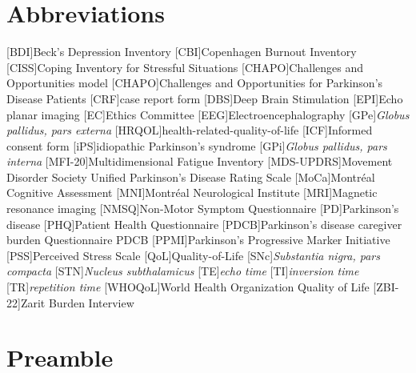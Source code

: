 

\chapter*{Abbreviations}
\thispagestyle{plain}
\begin{multicols}{2}
\begin{acronym}
[BDI]{Beck's Depression Inventory}
[CBI]{Copenhagen Burnout Inventory}
[CISS]{Coping Inventory for Stressful Situations}
[CHAPO]{Challenges and Opportunities model}
[CHAPO]{Challenges and Opportunities for Parkinson's Disease Patients}
[CRF]{case report form}
[DBS]{Deep Brain Stimulation}
[EPI]{Echo planar imaging}
[EC]{Ethics Committee}
[EEG]{Electroencephalography}
[GPe]{\textit{Globus pallidus, pars externa}}
[HRQOL]{health-related-quality-of-life}
[ICF]{Informed consent form}
[iPS]{idiopathic Parkinson's syndrome}
[GPi]{\textit{Globus pallidus, pars interna}}
[MFI-20]{Multidimensional Fatigue Inventory}
[MDS-UPDRS]{Movement Disorder Society Unified Parkinson's Disease Rating Scale}
[MoCa]{Montréal Cognitive Assessment}
[MNI]{Montréal Neurological Institute}
[MRI]{Magnetic resonance imaging}
[NMSQ]{Non-Motor Symptom Questionnaire}
[PD]{Parkinson's disease}
[PHQ]{Patient Health Questionnaire}
[PDCB]{Parkinson’s disease caregiver burden Questionnaire PDCB}
[PPMI]{Parkinson's Progressive Marker Initiative}
[PSS]{Perceived Stress Scale}
[QoL]{Quality-of-Life}
[SNc]{\textit{Substantia nigra, pars compacta}}
[STN]{\textit{Nucleus subthalamicus}}
[TE]{\textit{echo time}}
[TI]{\textit{inversion time}}
[TR]{\textit{repetition time}}
[WHOQoL]{World Health Organization Quality of Life}
[ZBI-22]{Zarit Burden Interview}
\end{acronym}
\end{multicols}

\chapter{Preamble}
